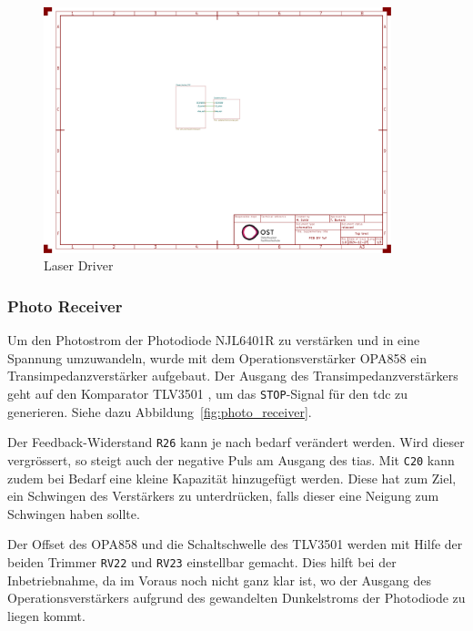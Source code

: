 
\begin{figure}[H]
    \centering
    \includegraphics[page=3, trim=100 520 550 60, clip, width=0.9\textwidth]{attachments/schematic.pdf}
    \caption{Laser Driver}\label{fig:laser_driver}
\end{figure}

\subsubsection{Photo Receiver}\label{sec:schematic_photo_receiver}

Um den Photostrom der Photodiode NJL6401R \cite{jrc2014njl6401r3_datasheet} zu verstärken und in eine Spannung umzuwandeln,
wurde mit dem Operationsverstärker OPA858 \cite{ti2018opa858_datasheet} ein Transimpedanzverstärker aufgebaut. Der
Ausgang des Transimpedanzverstärkers geht auf den Komparator TLV3501 \cite{ti2016tlv3501_datasheet}, um das \lstinline|STOP|-Signal
für den \acrshort{tdc} zu generieren. Siehe dazu Abbildung~\ref{fig:photo_receiver}.

Der Feedback-Widerstand \lstinline|R26| kann je nach bedarf verändert werden. Wird dieser vergrössert, so steigt auch der
negative Puls am Ausgang des \acrshort{tia}s. Mit \lstinline|C20| kann zudem bei Bedarf eine kleine Kapazität hinzugefügt
werden. Diese hat zum Ziel, ein Schwingen des Verstärkers zu unterdrücken, falls dieser eine Neigung zum Schwingen haben
sollte.

Der Offset des OPA858 und die Schaltschwelle des TLV3501 werden mit Hilfe der beiden Trimmer \lstinline|RV22| und
\lstinline|RV23| einstellbar gemacht. Dies hilft bei der Inbetriebnahme, da im Voraus noch nicht ganz klar ist,
wo der Ausgang des Operationsverstärkers aufgrund des gewandelten Dunkelstroms der Photodiode zu liegen kommt.

